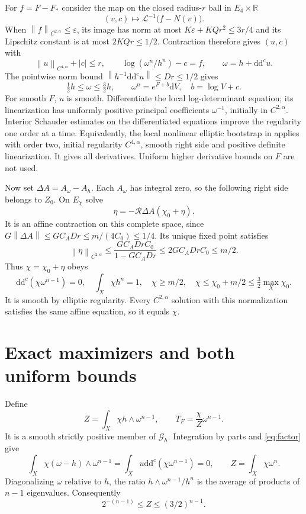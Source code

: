 \documentclass[11pt]{article}
\newcommand{\ddc}{\mathrm{d}\mathrm{d}^c}
\newcommand{\Ga}{\mathcal G_h}
\newcommand{\eps}{\varepsilon}
\newcommand{\norm}[1]{\left\|#1\right\|}
\begin{document}
For $f=F-F_*$ consider the map on the closed radius-$r$ ball in
$E_4\times\mathbb R$
\[
 (v,c)\longmapsto\mathcal L^{-1}\bigl(f-N(v)\bigr).
\]
When $\norm f_{C^{2,\alpha}}\le\eps$, its image has norm at most
$K\eps+KQr^2\le3r/4$ and its Lipschitz constant is at most
$2KQr\le1/2$. Contraction therefore gives $(u,c)$ with
\[
 \norm u_{C^{4,\alpha}}+|c|\le r,\qquad
 \log(\omega^n/h^n)-c=f,\qquad \omega=h+\ddc u.
\]
The pointwise norm bound $\norm{h^{-1}\ddc u}\le Dr\le1/2$ gives
\begin{equation}\label{eq:metric-comparison}
 \tfrac12h\le\omega\le\tfrac32h,\qquad
 \omega^n=e^{F+b}\mathrm dV,\quad b=\log V+c.
\end{equation}
For smooth $F$, $u$ is smooth. Differentiate the local log-determinant
equation; its linearization has uniformly positive principal
coefficients $\omega^{-1}$, initially in $C^{2,\alpha}$.
Interior Schauder estimates on the differentiated equations improve
the regularity one order at a time. Equivalently, the local nonlinear
elliptic bootstrap in \cite[Proposition and complete proof]{TaylorReg}
applies with order two, initial regularity $C^{4,\alpha}$, smooth
right side and positive definite linearization. It gives all
derivatives. Uniform higher derivative bounds on $F$ are not used.

Now set $\Delta A=A_\omega-A_h$. Each $A_\omega$ has integral zero,
so the following right side belongs to $Z_0$. On $E_\chi$ solve
\[
 \eta=-\mathcal R\Delta A(\chi_0+\eta).
\]
It is an affine contraction on this complete space, since
$G\norm{\Delta A}\le GC_ADr\le m/(4C_0)\le1/4$.
Its unique fixed point satisfies
\[
 \norm\eta_{C^{2,\alpha}}
  \le\frac{GC_ADrC_0}{1-GC_ADr}\le2GC_ADrC_0\le m/2.
\]
Thus $\chi=\chi_0+\eta$ obeys
\begin{equation}\label{eq:factor}
 \ddc(\chi\omega^{n-1})=0,\quad \int_X\chi h^n=1,
 \quad \chi\ge m/2,
 \quad \chi\le\chi_0+m/2\le\tfrac32\max_X\chi_0.
\end{equation}
It is smooth by elliptic regularity. Every $C^{2,\alpha}$ solution
with this normalization satisfies the same affine equation, so it
equals $\chi$.

\section{Exact maximizers and both uniform bounds}

Define
\[
 Z=\int_X\chi h\wedge\omega^{n-1},\qquad
 T_F=\frac\chi Z\omega^{n-1}.
\]
It is a smooth strictly positive member of $\Ga$. Integration by parts
and \eqref{eq:factor} give
\[
 \int_X\chi(\omega-h)\wedge\omega^{n-1}
       =\int_Xu\ddc(\chi\omega^{n-1})=0,
 \qquad Z=\int_X\chi\omega^n.
\]
Diagonalizing $\omega$ relative to $h$, the ratio
$h\wedge\omega^{n-1}/h^n$ is the average of products of $n-1$
eigenvalues. Consequently
\begin{equation}\label{eq:Z}
 2^{-(n-1)}\le Z\le(3/2)^{n-1}.
\end{equation}
\end{document}

